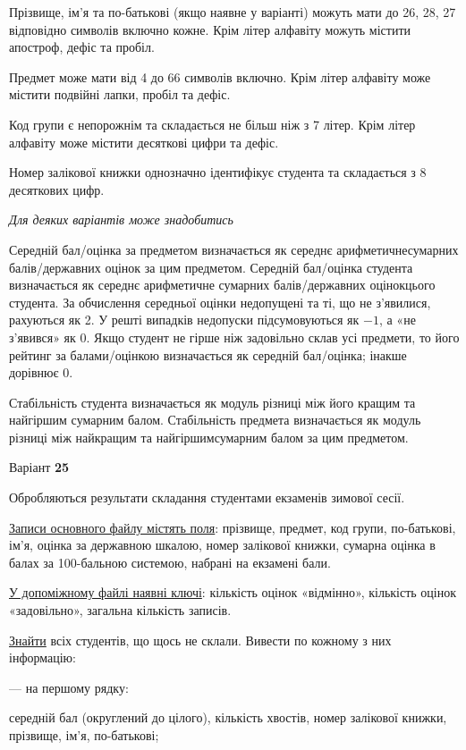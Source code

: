\documentclass[11pt, ukrainian]{article}
\begin{document}
Прізвище, ім’я та по-батькові (якщо наявне у варіанті) можуть мати до 26, 28, 27 відповідно символів включно кожне. 
Крім літер алфавіту можуть містити апостроф, дефіс та пробіл.

Предмет може мати від 4 до 66 символів включно. 
Крім літер алфавіту може містити подвійні лапки, пробіл та дефіс.

Код групи є непорожнім та складається не більш ніж з 7 літер. 
Крім літер алфавіту може містити десяткові цифри та дефіс.


Номер залікової книжки однозначно ідентифікує студента та складається з 8 десяткових цифр. 

\bigskip\textit{Для деяких варіантів може знадобитись}

Середній бал/оцінка за предметом визначається як середнє арифметичнесумарних балів/державних оцінок за цим предметом. 
Середній бал/оцінка студента визначається як середнє арифметичне сумарних балів/державних оцінокцього студента. 
За обчислення середньої оцінки недопущені та ті, що не з’явилися, рахуються як 2.
У решті випадків недопуски підсумовуються як $-1$, а «не з’явився» як 0.
Якщо студент не гірше ніж задовільно склав усі предмети, 
то його рейтинг за балами/оцінкою визначається як середній бал/оцінка; інакше дорівнює 0.

Стабільність студента визначається як модуль різниці між його кращим та найгіршим сумарним балом.
Стабільність предмета визначається як модуль різниці між найкращим та найгіршимсумарним балом за цим предметом.




\par
\newpage
{\center Варіант  \No \textbf { 25 }\par}
\bigskip
Обробляються результати складання студентами екзаменів зимової сесії.

\underline{Записи основного файлу містять поля}: прізвище, предмет, код групи, по-батькові, ім’я, оцінка за державною шкалою, номер залікової книжки, сумарна оцінка в балах за 100-бальною системою, набрані на екзамені бали.

\underline{У допоміжному файлі наявні ключі}: кількість оцінок «відмінно», кількість оцінок «задовільно», загальна кількість записів.

\underline{Знайти} всіх студентів, що щось не склали. Вивести по кожному з них інформацію:\par
{\noindent}--- на першому рядку:\par
середній бал (округлений до цілого), кількість хвостів, номер залікової книжки, прізвище, ім’я, по-батькові;
\end{document}
